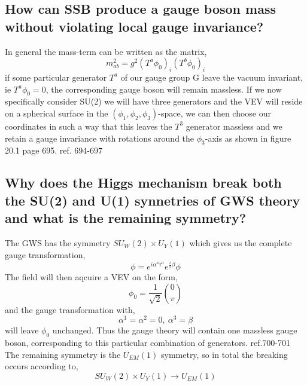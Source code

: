 \documentclass[paper=a4, fontsize=11pt]{scrartcl} %
\numberwithin{equation}{section} %
\numberwithin{figure}{section} %
\numberwithin{table}{section} %
\begin{document}
\subsection*{How can SSB produce a gauge boson mass without violating local gauge invariance?}
In general the mass-term can be written as the matrix,
\begin{equation}
m^2_{ab} = g^2(T^a\phi_0)_i(T^b \phi_0)_i
\end{equation}
if some particular generator $T^a$ of our gauge group G leave the vacuum invariant, ie $T^a\phi_0 = 0$, the corresponding gauge boson will remain massless.
If we now specifically consider SU(2) we will have three generators and the VEV will reside on a spherical surface in the $(\phi_1, \phi_2, \phi_3)$-space, we can then choose our coordinates in such a way that this leaves the $T^3$ generator massless and we retain a gauge invariance with rotations around the $\phi_3$-axis as shown in figure 20.1 page 695.
ref. 694-697
\subsection*{Why does the Higgs mechanism break both the SU(2) and U(1) synnetries of GWS theory and what is the remaining symmetry?}
The GWS has the symmetry $SU_W(2) \times U_Y(1)$ which gives us the complete gauge transformation,
\begin{equation}
\phi = e^{i\alpha ^a \tau ^a} e^{\frac{i}{2}\beta} \phi
\end{equation}
The field will then aqcuire a VEV on the form,
\begin{equation}
\phi_0 = \frac{1}{\sqrt{2}} {0 \choose v}
\end{equation}
and the gauge transformation with,
\begin{equation}
\alpha ^1 = \alpha ^2 = 0, ~ \alpha ^3 = \beta
\end{equation}
will leave $\phi_0$ unchanged. Thus the gauge theory will contain one massless gauge boson, corresponding to this particular combination of generators.
ref.700-701
The remaining symmetry is the $U_{EM}(1)$ symmetry, so in total the breaking occurs according to,
\begin{equation}
SU_W(2) \times U_Y(1) \rightarrow U_{EM}(1)
\end{equation}
\end{document}
